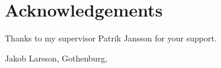 \thispagestyle{plain}     %
\section*{Acknowledgements}
Thanks to my supervisor Patrik Jansson for your support.

\vspace{1.5cm}
\hfill
Jakob Larsson, Gothenburg, \monthname \space \the\year

\newpage        %
\thispagestyle{empty}
\mbox{}

